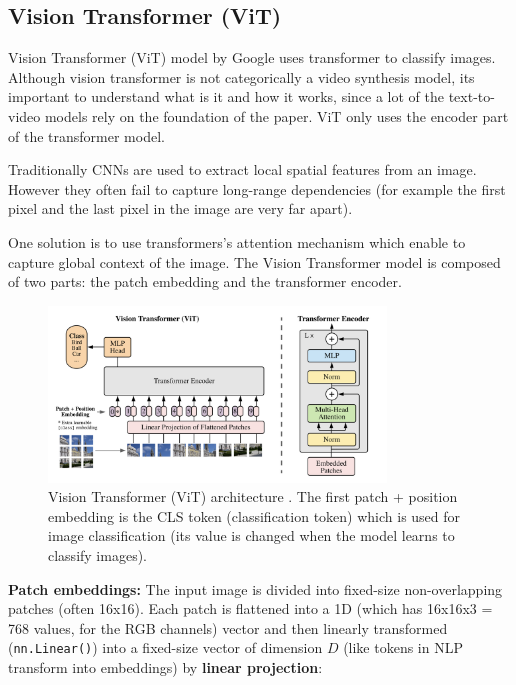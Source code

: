 \subsection{Vision Transformer (ViT)}
\label{appendix:vision_transformer}

Vision Transformer \cite{vision_transformer} (ViT) model by Google uses transformer to classify images. Although vision transformer is not categorically a video synthesis model, its important to understand what is it and how it works, since a lot of the text-to-video models rely on the foundation of the paper. ViT only uses the encoder part of the transformer model.

Traditionally CNNs are used to extract local spatial features from an image. However they often fail to capture long-range dependencies (for example the first pixel and the last pixel in the image are very far apart).

One solution is to use transformers's attention mechanism which enable to capture global context of the image. The Vision Transformer model is composed of two parts: the patch embedding and the transformer encoder.

\begin{figure}
    \centering
    \includegraphics[width=0.8\textwidth]{images/appendix/vision_transformer/architecture.png}
    \caption{Vision Transformer (ViT) architecture \cite{vision_transformer}. The first patch + position embedding is the CLS token (classification token) which is used for image classification (its value is changed when the model learns to classify images).}
\end{figure}

\textbf{Patch embeddings:} The input image is divided into fixed-size non-overlapping patches (often 16x16). Each patch is flattened into a 1D (which has 16x16x3 = 768 values, for the RGB channels) vector and then linearly transformed (\texttt{nn.Linear()}) into a fixed-size vector of dimension $D$ (like tokens in NLP transform into embeddings) by \textbf{linear projection}:

